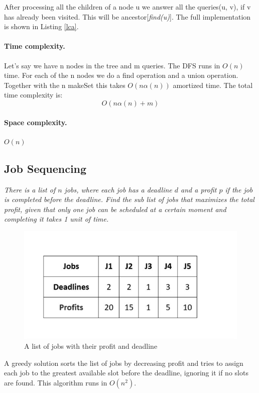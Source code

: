 \documentclass{article}
\begin{document}
After processing all the children of a node u we answer all the
queries(u, v), if v has already been visited. This will be ancestor[\emph{find(u)}]. The full implementation
is shown in Listing \ref{lca}.

\paragraph{Time complexity.} Let's say we have n nodes in the tree and m queries.
The DFS runs in $O(n)$ time. For each of the n nodes we do a find operation and a union operation. Together
with the n makeSet this takes $O(n\alpha(n))$ amortized time.
The total time complexity is: 
$$O(n\alpha(n) + m)$$

\paragraph{Space complexity.} $O(n)$


\subsection{Job Sequencing}
\emph{There is a list of $n$ jobs, where each job has a deadline $d$ and a profit $p$ if the job
is completed before the deadline. Find the sub list of jobs that maximizes the total profit, given
that only one job can be scheduled at a certain moment and completing it takes 1 unit of time.}
\begin{figure}[h!]
    \centering
    \includegraphics[scale=0.5]{img/jobs.jpeg}
    \caption{A list of jobs with their profit and deadline}
\end{figure}

\bigskip
A greedy solution \cite{key} sorts the list of jobs by decreasing profit and tries to assign each job to the greatest available slot before the deadline, ignoring it if no slots
are found. This algorithm runs in $O(n^2)$.
\end{document}
